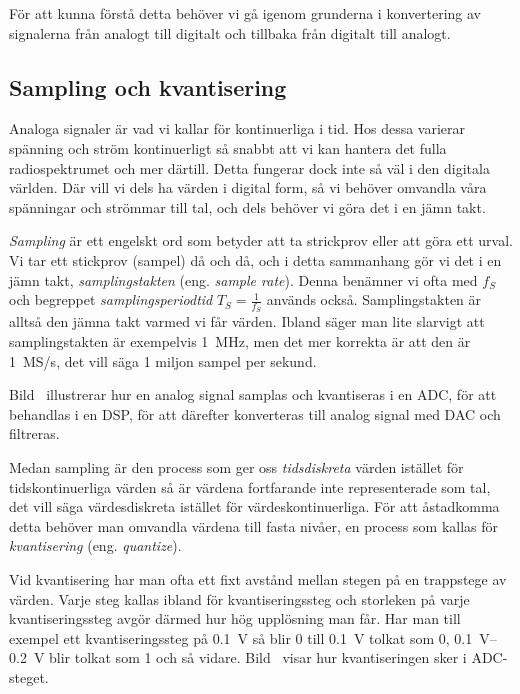 För att kunna förstå detta behöver vi gå igenom grunderna i konvertering av
signalerna från analogt till digitalt och tillbaka från digitalt till analogt.

\subsection{Sampling och kvantisering}
\label{sampling}

Analoga signaler är vad vi kallar för kontinuerliga i tid.
Hos dessa varierar spänning och ström kontinuerligt så snabbt att vi kan hantera
det fulla radiospektrumet och mer därtill.
Detta fungerar dock inte så väl i den digitala världen.
Där vill vi dels ha värden i digital form, så vi behöver omvandla våra
spänningar och strömmar till tal, och dels behöver vi göra det i en jämn takt.

\emph{Sampling} är ett engelskt ord som betyder att ta strickprov eller att göra
ett urval.
Vi tar ett stickprov (sampel) då och då, och i detta sammanhang gör vi det i en
jämn takt, \emph{samplingstakten} (eng. \emph{sample rate}).
Denna benämner vi ofta med \(f_S\) och begreppet \emph{samplingsperiodtid}
\(T_S=\frac{1}{f_S}\) används också.
Samplingstakten är alltså den jämna takt varmed vi får värden.
Ibland säger man lite slarvigt att samplingstakten är exempelvis
\qty{1}{\mega\hertz}, men det mer korrekta är att den är 1~MS/s, det vill säga 1
miljon sampel per sekund.

Bild~ illustrerar hur en analog signal samplas och
kvantiseras i en ADC, för att behandlas i en DSP, för att därefter konverteras
till analog signal med DAC och filtreras.

Medan sampling är den process som ger oss \emph{tidsdiskreta} värden istället
för tidskontinuerliga värden så är värdena fortfarande inte representerade som
tal, det vill säga värdesdiskreta istället för värdeskontinuerliga.
För att åstadkomma detta behöver man omvandla värdena till fasta nivåer, en
process som kallas för \emph{kvantisering} (eng. \emph{quantize}).

Vid kvantisering har man ofta ett fixt avstånd mellan stegen på en trappstege
av värden.
Varje steg kallas ibland för kvantiseringssteg och storleken på varje
kvantiseringssteg avgör därmed hur hög upplösning man får.
Har man till exempel ett kvantiseringssteg på \qty{0,1}{\volt} så blir 0 till
\qty{0,1}{\volt} tolkat som 0, \SIrange{0,1}{0,2}{\volt} blir tolkat som 1 och
så vidare.
Bild~ visar hur kvantiseringen sker i ADC-steget.

